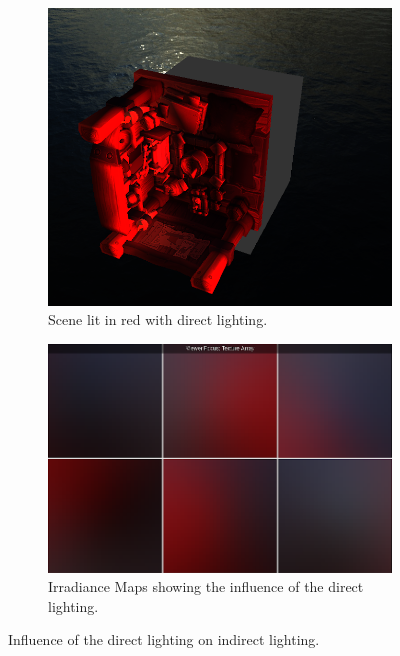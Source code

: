 \documentclass{rapportCS}
\begin{document}
\begin{figure}
    \begin{subfigure}{0.5\textwidth}
        \includegraphics[width=1\linewidth]{figures/ibl-result-3.png}
        \caption{Scene lit in red with direct lighting.}
        \label{fig:subim6}
    \end{subfigure}\hfill
    \begin{subfigure}{0.5\textwidth}
        \includegraphics[width=1\linewidth]{figures/irradiance-map-3.png} 
        \caption{Irradiance Maps showing the influence of the direct lighting.}
        \label{fig:subim7}
    \end{subfigure}
    \caption{Influence of the direct lighting on indirect lighting.}
\end{figure}
\end{document}
